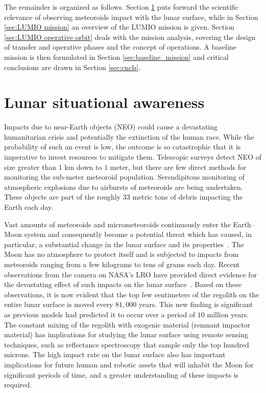 The remainder is organized as follows. Section \ref{sec:Lunar situational awareness} puts forward the scientific relevance of observing meteoroids impact with the lunar surface, while in Section \ref{sec:LUMIO mission} an overview of the LUMIO mission is given. Section \ref{sec:LUMIO operative orbit} deals with the mission analysis, covering the design of transfer and operative phases and the concept of operations. A baseline mission is then formulated in Section \ref{sec:baseline_mission} and critical conclusions are drawn in Section \ref{sec:cncls}.

%
\section{Lunar situational awareness}\label{sec:Lunar situational awareness}
Impacts due to near-Earth objects (NEO) could cause a devastating humanitarian crisis and potentially the extinction of the human race. While the probability of such an event is low, the outcome is so catastrophic that it is imperative to invest resources to mitigate them. Telescopic surveys detect {NEO} of size greater than $1$ km down to $1$ meter, but there are few direct methods for monitoring the sub-meter meteoroid population. Serendipitous monitoring of atmospheric explosions due to airbursts of meteoroids are being undertaken. These objects are part of the roughly $33$ metric tons of debris impacting the Earth each day.

Vast amounts of meteoroids and micrometeoroids continuously enter the Earth--Moon system and consequently become a potential threat which has caused, in particular, a substantial change in the lunar surface and its {properties~\cite{oberst2012present}}. The Moon has no atmosphere to protect itself and is subjected to impacts from meteoroids ranging from a few kilograms to tens of grams each day. Recent observations from the camera on NASA's {LRO} have provided direct evidence for the devastating effect of such impacts on the lunar {surface~\cite{speyerer2016quantifying}}. Based on these observations, it is now evident that the top few centimeters of the regolith on the entire lunar surface is moved every $81,000$ years. This new finding is significant as previous models had predicted it to occur over a period of $10$ million years. The constant mixing of the regolith with exogenic material (remnant impactor material) has implications for studying the lunar surface using remote sensing techniques, such as reflectance spectroscopy that sample only the top hundred microns. The high impact rate on the lunar surface also has important implications for future human and robotic assets that will inhabit the Moon for significant periods of time, and a greater understanding of these impacts is required.

